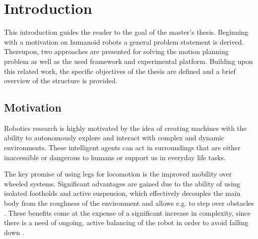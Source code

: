 
\chapter{Introduction}\label{c1}
This introduction guides the reader to the goal of the master's thesis. Beginning with a motivation on humanoid robots a general problem statement is derived. Thereupon, two approaches are presented for solving the motion planning problem as well as the used framework and experimental platform. Building upon this related work, the specific objectives of the thesis are defined and a brief overview of the structure is provided.

\section{Motivation}\label{sec:IntroMotivation}
Robotics research is highly motivated by the idea of creating machines with the ability to autonomously explore and interact with complex and dynamic environments. These intelligent agents can act in surroundings that are either inaccessible or dangerous to humans or support us in everyday life tasks. 
 
The key promise of using legs for locomotion is the improved mobility over wheeled systems. Significant advantages are gained due to the ability of using isolated footholds and active suspension, which effectively decouples the main body from the roughness of the environment and allows e.g. to step over obstacles \cite{raibert1986legged}. These benefits come at the expense of a significant increase in complexity, since there is a need of ongoing, active balancing of the robot in order to avoid falling down \cite{wieber2016modeling}.

